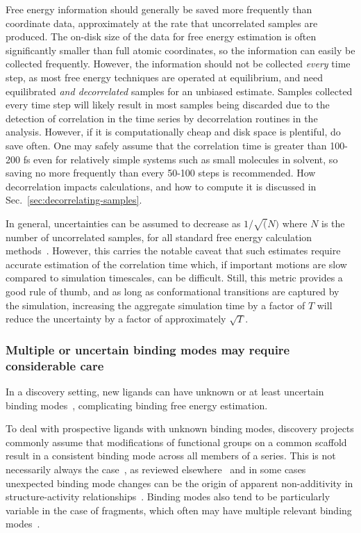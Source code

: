 \documentclass[9pt,bestpractices]{livecoms}
\begin{document}
Free energy information should generally be saved more frequently than coordinate data, approximately at the rate that uncorrelated samples are produced.  
The on-disk size of the data for free energy estimation is often significantly smaller than full atomic coordinates, so the information can easily be collected frequently. 
However, the information should not be collected \textit{every} time step, as most free energy techniques are operated at equilibrium, and need equilibrated \textit{and decorrelated} samples for an unbiased estimate.
Samples collected every time step will likely result in most samples being discarded due to the detection of correlation in the time series by decorrelation routines in the analysis. However, if it is computationally cheap and disk space is plentiful, do save often. One may safely assume that the correlation time is greater than 100-200 fs even for relatively simple systems such as small molecules in solvent, so saving no more frequently than every 50-100 steps is recommended. 
How decorrelation impacts calculations, and how to compute it is discussed in Sec.~\ref{sec:decorrelating-samples}.

In general, uncertainties can be assumed to decrease as $1/\sqrt(N)$ where $N$ is the number of uncorrelated samples, for all standard free energy calculation methods~\cite{shirts2005comparison}. However, this carries the notable caveat that such estimates require accurate estimation of the correlation time which, if important motions are slow compared to simulation timescales, can be difficult. Still, this metric provides a good rule of thumb, and as long as conformational transitions are captured by the simulation, increasing the aggregate simulation time by a factor of $T$ will reduce the uncertainty by a factor of approximately $\sqrt{T}$.

\subsubsection{Multiple or uncertain binding modes may require considerable care}
\label{sec:multiple_binding_modes}
In a discovery setting, new ligands can have unknown or at least uncertain binding modes~\cite{kaus2015how, plountprice2000analysis,mobley2009binding,calabro2016elucidation}, complicating binding free energy estimation.

To deal with prospective ligands with unknown binding modes, discovery projects commonly assume that modifications of functional groups on a common scaffold result in a consistent binding mode across all members of a series.
This is not necessarily always the case~\cite{kaus2015how}, as reviewed elsewhere~\cite{mobley2009binding} and in some cases unexpected binding mode changes can be the origin of apparent non-additivity in structure-activity relationships~\cite{calabro2016elucidation}.
Binding modes also tend to be particularly variable in the case of fragments, which often may have multiple relevant binding modes~\cite{steinbrecher2015accurate}.
\end{document}
